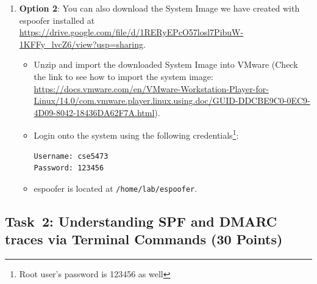\documentclass[11pt]{article}
\newcommand{\espoofer}{{\sf espoofer}\xspace}
\newcommand{\dmark}{{\sf DMARC}\xspace}
\newcommand{\spf}{{\sf SPF}\xspace}
\begin{document}
\begin{enumerate}
\item \textbf{Option 2}: You can also download the System Image we have created with \espoofer installed at \url{https://drive.google.com/file/d/1RERyEPcO57losl7PibuW-1KFFy_lvcZ6/view?usp=sharing}. 
\begin{itemize}
\item Unzip and import the downloaded System Image into VMware (Check the link to see how to import the system image:  \url{https://docs.vmware.com/en/VMware-Workstation-Player-for-Linux/14.0/com.vmware.player.linux.using.doc/GUID-DDCBE9C0-0EC9-4D09-8042-18436DA62F7A.html}).
\item Login onto the system using the following credentials\footnote{Root user's password is 123456 as well}: 
 \begin{lstlisting}
Username: cse5473
Password: 123456
\end{lstlisting}\vspace{-6mm}
\item \espoofer is located at \texttt{/home/lab/espoofer}.
\end{itemize}


 
\end{enumerate}
 
\subsection{Task~2: Understanding \spf and \dmark traces via Terminal Commands (30 Points)}
\end{document}
